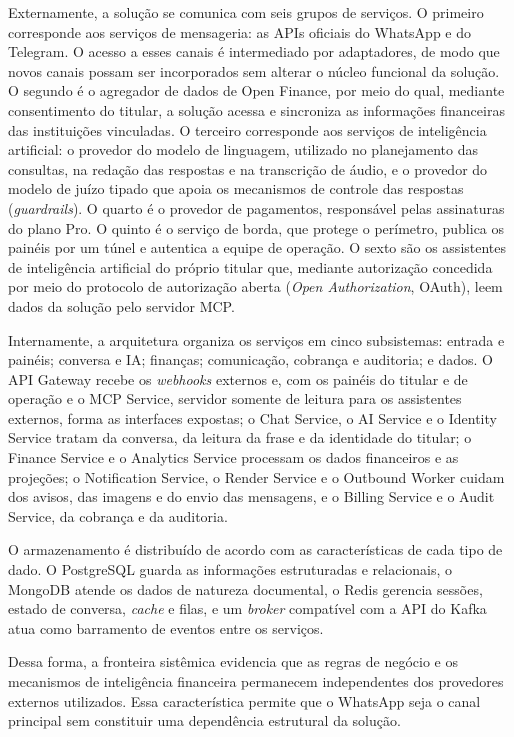 Externamente, a solução se comunica com seis grupos de serviços. O primeiro corresponde aos serviços de mensageria: as APIs oficiais do WhatsApp e do Telegram. O acesso a esses canais é intermediado por adaptadores, de modo que novos canais possam ser incorporados sem alterar o núcleo funcional da solução. O segundo é o agregador de dados de Open Finance, por meio do qual, mediante consentimento do titular, a solução acessa e sincroniza as informações financeiras das instituições vinculadas. O terceiro corresponde aos serviços de inteligência artificial: o provedor do modelo de linguagem, utilizado no planejamento das consultas, na redação das respostas e na transcrição de áudio, e o provedor do modelo de juízo tipado que apoia os mecanismos de controle das respostas (\textit{guardrails}). O quarto é o provedor de pagamentos, responsável pelas assinaturas do plano Pro. O quinto é o serviço de borda, que protege o perímetro, publica os painéis por um túnel e autentica a equipe de operação. O sexto são os assistentes de inteligência artificial do próprio titular que, mediante autorização concedida por meio do protocolo de autorização aberta (\textit{Open Authorization}, OAuth), leem dados da solução pelo servidor MCP.

Internamente, a arquitetura organiza os serviços em cinco subsistemas: entrada e painéis; conversa e IA; finanças; comunicação, cobrança e auditoria; e dados. O API Gateway recebe os \textit{webhooks} externos e, com os painéis do titular e de operação e o MCP Service, servidor somente de leitura para os assistentes externos, forma as interfaces expostas; o Chat Service, o AI Service e o Identity Service tratam da conversa, da leitura da frase e da identidade do titular; o Finance Service e o Analytics Service processam os dados financeiros e as projeções; o Notification Service, o Render Service e o Outbound Worker cuidam dos avisos, das imagens e do envio das mensagens, e o Billing Service e o Audit Service, da cobrança e da auditoria.

O armazenamento é distribuído de acordo com as características de cada tipo de dado. O PostgreSQL guarda as informações estruturadas e relacionais, o MongoDB atende os dados de natureza documental, o Redis gerencia sessões, estado de conversa, \textit{cache} e filas, e um \textit{broker} compatível com a API do Kafka atua como barramento de eventos entre os serviços.

Dessa forma, a fronteira sistêmica evidencia que as regras de negócio e os mecanismos de inteligência financeira permanecem independentes dos provedores externos utilizados. Essa característica permite que o WhatsApp seja o canal principal sem constituir uma dependência estrutural da solução.

